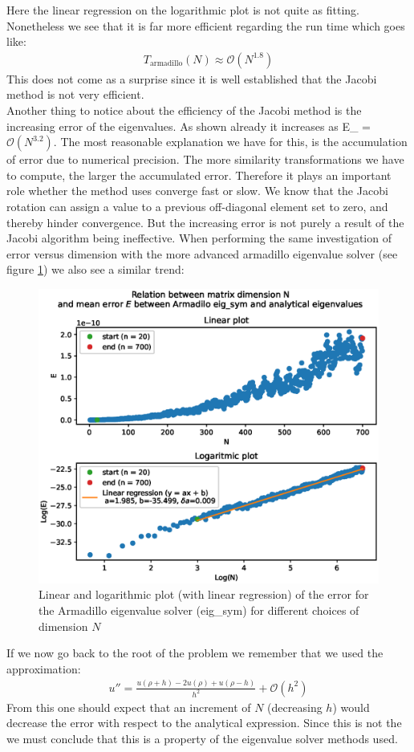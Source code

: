 \documentclass[american,a4paper,12pt]{article}
\begin{document}
Here the linear regression on the logarithmic plot is not quite as fitting. Nonetheless we see that it is far more efficient regarding the run time which goes like:
\begin{align*}
    T_{\text{armadillo}}(N) \approx \mathcal{O}(N^{1.8})
\end{align*}
This does not come as a surprise since it is well established that the Jacobi method is not very efficient. \\
Another thing to notice about the efficiency of the Jacobi method is the increasing error of the eigenvalues. As shown already it increases as E_{} = $\mathcal{O}(N^{3.2})$. The most reasonable explanation we have for this, is the accumulation of error due to numerical precision. The more similarity transformations we have to compute, the larger the accumulated error. Therefore it plays an important role whether the method uses converge fast or slow. We know that the Jacobi rotation can assign a value to a previous off-diagonal element set to zero, and thereby hinder convergence. But the increasing error is not purely a result of the Jacobi algorithm being ineffective. When performing the same investigation of error versus dimension with the more advanced armadillo eigenvalue solver (see figure \ref{fig:error_dim_armadillo}) we also see a similar trend:
\begin{figure}[H]
    \centering
    \includegraphics[width = \textwidth]{figures/error_dim_armadillo.eps}
    \caption{Linear and logarithmic plot (with linear regression) of the error for the Armadillo eigenvalue solver (eig\_sym) for different choices of dimension $N$}
    \label{fig:error_dim_armadillo}
\end{figure}
If we now go back to the root of the problem we remember that we used the approximation:
\begin{align*}
    u'' = \frac{u(\rho + h) - 2u(\rho) + u(\rho - h)}{h^2} + \mathcal{O}(h^2)
\end{align*}
From this one should expect that an increment of $N$ (decreasing $h$) would decrease the error with respect to the analytical expression. Since this is not the we must conclude that this is a property of the eigenvalue solver methods used. 
\end{document}
